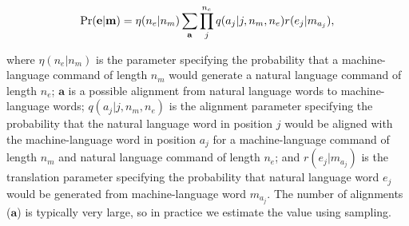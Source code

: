 \documentclass[conference]{IEEEtran}
\begin{document}
{\small
\begin{equation}
\vspace{-1em}
\Pr({\mathbf e} | {\mathbf m}) = \eta(n_e | n_m) \sum_{\mathbf a} \prod_j^{n_e} q(a_j | j, n_m, n_e) r(e_j | m_{a_j}),
\end{equation}
}

\noindent where $\eta(n_e | n_m)$ is the parameter specifying the probability that a machine-language command of length $n_m$ %
would generate a natural language command of length $n_e$; %
${\mathbf a}$ is a possible alignment from natural language words to machine-language words; $q(a_j | j, n_m, n_e)$ is the alignment parameter specifying the probability that the natural language word in position $j$ would be aligned with the machine-language word in position $a_j$ for a machine-language command of length $n_m$ and natural language command of length $n_e$;  and $r(e_j | m_{a_j})$ is the translation parameter specifying the probability that natural language word $e_j$ would be generated from machine-language word $m_{a_j}$. The number of alignments (${\mathbf a}$) is typically very large, so in practice we estimate the value using sampling. 
 
\end{document}
